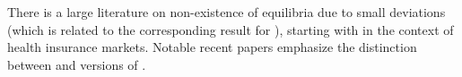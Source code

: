 There is a large literature on non-existence of equilibria due to small deviations   (which is related to the corresponding result for \HardMaxRandom), starting with \cite{Rothschild-Stiglitz-76} in the context of health insurance markets. Notable recent papers \citep{Veiga-Weyl-16,Azevedo-Gottlieb-17} emphasize the distinction between \HardMax and versions of \SoftMaxRandom.






